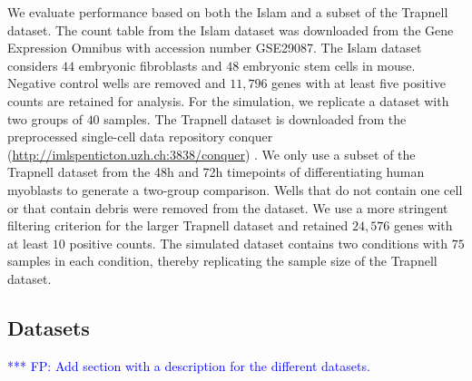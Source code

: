 \documentclass{bmcart}
\newcommand{\fanny}[1]{\textcolor{blue}{*** FP: #1}}
\begin{document}
We evaluate performance based on both the Islam \cite{Islam2011} and a subset of the Trapnell \cite{Trapnell2013} dataset. The count table from the Islam dataset was downloaded from the Gene Expression Omnibus with accession number GSE29087. The Islam dataset considers $44$ embryonic fibroblasts and $48$ embryonic stem cells in mouse. Negative control wells are removed and $11,796$ genes with at least five positive counts are retained for analysis. For the simulation, we replicate a dataset with two groups of $40$ samples. The Trapnell dataset is downloaded from the preprocessed single-cell data repository conquer (\url{http://imlspenticton.uzh.ch:3838/conquer}) \cite{Soneson2017}. We only use a subset of the Trapnell dataset from the 48h and 72h timepoints of differentiating human myoblasts to generate a two-group comparison. Wells that do not contain one cell or that contain debris were removed from the dataset. We use a more stringent filtering criterion for the larger Trapnell dataset and retained $24,576$ genes with at least $10$ positive counts. The simulated dataset contains two conditions with $75$ samples in each condition, thereby replicating the sample size of the Trapnell dataset.

\subsection*{Datasets}

\fanny{Add section with a description for the different datasets.}\\
\end{document}
